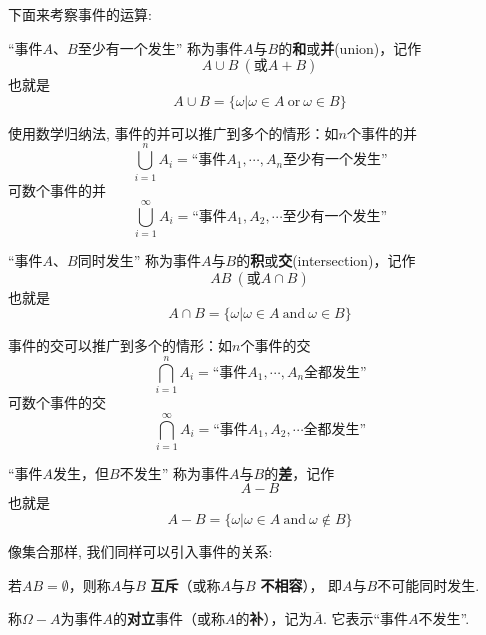 下面来考察事件的运算: 

\begin{definition}[事件的并]
    
        “事件$A$、$B$至少有一个发生”
    称为事件$A$与$B$的\textbf{和}或\textbf{并}(union)，记作
    $$A\cup B \ (\text{或}A+B)$$
    也就是
    $$A\cup B=\{\omega | \omega\in A \ \text{or}\ \omega\in B\}$$
\end{definition}

\begin{remark}
    使用数学归纳法, 事件的并可以推广到多个的情形：如$n$个事件的并
    $$\bigcup_{i=1}^{n} A_i =\text{“事件$A_1, \cdots, A_n$至少有一个发生”}$$
    可数个事件的并
    $$\bigcup_{i=1}^{\infty} A_i =\text{“事件$A_1, A_2, \cdots$至少有一个发生”}$$
\end{remark}

\begin{definition}
        “事件$A$、$B$同时发生”
    称为事件$A$与$B$的\textbf{积}或\textbf{交}(intersection)，记作
    $$AB \ (\text{或}A\cap B)$$
    也就是$$A\cap B=\{\omega | \omega\in A \ \text{and}\ \omega\in B\}$$
\end{definition}

\begin{remark}
    事件的交可以推广到多个的情形：如$n$个事件的交
    $$\bigcap_{i=1}^{n} A_i =\text{“事件$A_1, \cdots, A_n$全都发生”}$$
    可数个事件的交
    $$\bigcap_{i=1}^{\infty} A_i =\text{“事件$A_1, A_2, \cdots$全都发生”}$$
\end{remark}

\begin{definition}
    “事件$A$发生，但$B$不发生”
称为事件$A$与$B$的\textbf{差}，记作
$$A-B$$
也就是
$$A- B=\{\omega | \omega\in A \ \text{and}\ \omega\notin B\}$$
\end{definition}

像集合那样, 我们同样可以引入事件的关系: 

\begin{definition}
    若$AB=\emptyset$，则称$A$与$B$ \textbf{互斥}（或称$A$与$B$ \textbf{不相容}），%
    即$A$与$B$不可能同时发生. 
\end{definition}

\begin{definition}
    称$\Omega-A$为事件$A$的\textbf{对立}事件（或称$A$的\textbf{补}），记为$\overline{A}$. 
    它表示“事件$A$不发生”. 
\end{definition}


